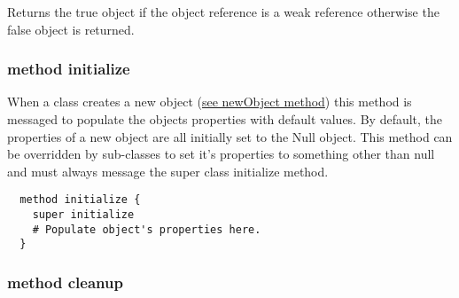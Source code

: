 Returns the true object if the object reference is a weak reference otherwise the false object is returned.

\hfill
\subsubsection {method initialize}
When a class creates a new object
(\hyperref[sec:class_method_newobject]{see newObject method}) this method is messaged to populate the objects properties with default values. By default, the properties of a new object are all initially set to the Null object. This method can be overridden by sub-classes to set it's properties to something other than null and must always message the super class initialize method.

\begin{lstlisting}
  method initialize {
    super initialize
    # Populate object's properties here.
  }
\end{lstlisting}

\subsubsection {method cleanup}
